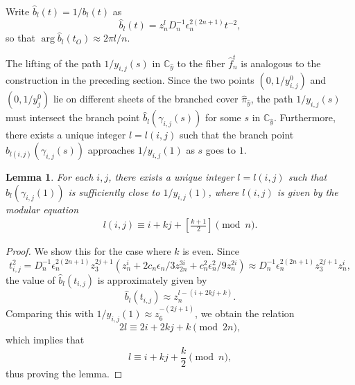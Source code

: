 \documentclass[10pt,a4paper,reqno]{amsart}
\newtheorem{lem}[thm]{Lemma}
\theoremstyle{definition}
\numberwithin{equation}{section}
\numberwithin{figure}{section}
\newcommand{\C}{\mathbb{C}}
\newcommand{\ep}{\epsilon}
\begin{document}
Write $\hat{b}_l(t)=1/b_l(t)$ as
\[\hat{b}_l(t)=z_n^l D_n^{-1} {\ep_n^{2(2n+1)}} t^{-2},\]
so that $\arg{\hat{b}_l(t_O)} \approx 2\pi l /n$.




The lifting of the path $1/y_{i,j}(s)$ in $\C_{\hat{y}}$ to the fiber $\hat{f}_n^t$ is analogous to the construction in the preceding section.
Since the two points $(0,1/y_{i,j}^0)$ and $(0,1/y_j^0)$ lie on different sheets of the branched cover $\hat{\pi}_{\hat{y}}$, 
the path $1/y_{i,j}(s)$ must intersect the branch point $\hat{b}_l(\gamma_{i,j}(s))$ for some $s$ in $\C_{\hat{y}}$. 
Furthermore, there exists a unique integer $l=l(i,j)$ such that the branch point $\hat{b}_{l(i,j)}(\gamma_{i,j}(s))$ approaches $1/y_{i,j}(1)$ as $s$ goes to $1$.

\begin{lem}
For each $i,j$, there exists a unique integer $l= l(i,j)$ such that $\hat{b}_l(\gamma_{i,j}(1))$ is sufficiently close to $1/y_{i,j}(1)$, 
where $l(i,j)$ is given by the modular equation
\begin{align}
l(i,j)\equiv i+kj+\left[\frac{k+1}{2}\right] \pmod{n}.
\end{align}
\end{lem}

\begin{proof}
We show this for the case where $k$ is even.
Since \[t_{i,j}^2=D_n^{-1}{\ep_n^{2(2n+1)}} z_3^{2j+1}(z_n^i +2c_n {\ep_n}/3 z_{2n}^{3i}+ c_n^2{\ep_n^{2}}/9 z_n^{2i}) \approx D_n^{-1}{\ep_n^{2(2n+1)}} z_3^{2j+1}z_n^i, \]
the value of $\hat{b}_l(t_{i,j})$ is approximately given by
\[\hat{b}_l(t_{i,j}) \approx z_n^{l-(i+2kj+k)}.\]
Comparing this with $1/y_{i,j}(1) \approx z_6^{-(2j+1)}$, we obtain the relation 
\[2l \equiv 2i +2kj +k \pmod{2n},\]
which implies that \[l \equiv i +kj + \frac{k}{2} \pmod{n},\]
thus proving the lemma.
\end{proof}
\end{document}
